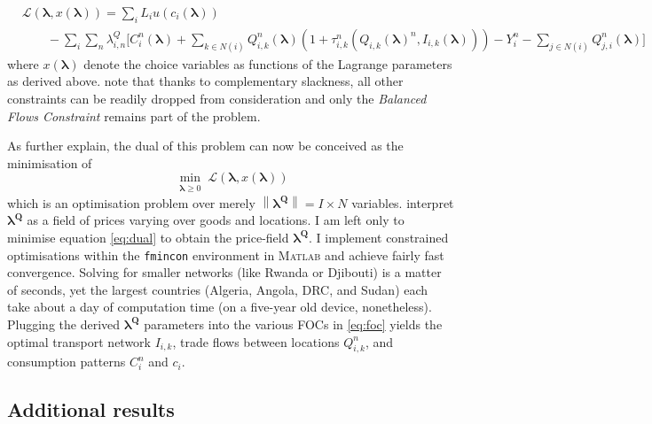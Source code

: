 \documentclass[11pt, oneside]{article}   	%
\begin{document}
\begin{equation}
  \label{eq:dual}
  \begin{aligned}
    & \mathcal{L}(\bm{\lambda}, x(\bm{\lambda})) = \sum_{i}^{} L_{i}u(c_{i}(\bm{\lambda})) \\
  & \qquad - \sum_{i}^{}\sum_{n}^{}\lambda^{Q}_{i,n}\bigg[ C_{i}^{n}(\bm{\lambda}) + \sum_{k\in N(i)}^{}Q_{i,k}^{n}(\bm{\lambda})(1+\tau_{i,k}^{n}(Q_{i,k}(\bm{\lambda})^{n}, I_{i,k}(\bm{\lambda}))) - Y_{i}^{n} - \sum_{j\in N(i)}^{}Q_{j,i}^{n}(\bm{\lambda}) \bigg]
  \end{aligned}
\end{equation}
where $x(\bm{\lambda})$ denote the choice variables as functions of the Lagrange parameters as derived above. \citeauthor{fajgelbaum_optimal_2017} note that thanks to complementary slackness, all other constraints can be readily dropped from consideration and only the \emph{Balanced Flows Constraint} remains part of the problem.

As \citeauthor{fajgelbaum_optimal_2017} further explain, the dual of this problem can now be conceived as the minimisation of
\begin{equation*}
  \!\min_{\substack{\bm{\lambda} \geq 0}}\mathcal{L}(\bm{\lambda}, x(\bm{\lambda}))
\end{equation*}
which is an optimisation problem over merely $\left\lVert\bm{\lambda^{Q}}\right\rVert = I \times N$ variables. \citeauthor{fajgelbaum_optimal_2017} interpret $\bm{\lambda^{Q}}$ as a field of prices varying over goods and locations. I am left only to minimise equation \eqref{eq:dual} to obtain the price-field $\bm{\lambda^{Q}}$. I implement constrained optimisations within the \texttt{fmincon} environment in \textsc{Matlab} and achieve fairly fast convergence. Solving for smaller networks (like Rwanda or Djibouti) is a matter of seconds, yet the largest countries (Algeria, Angola, DRC, and Sudan) each take about a day of computation time (on a five-year old device, nonetheless). Plugging the derived $\bm{\lambda^{Q}}$ parameters into the various FOCs in \eqref{eq:foc} yields the optimal transport network $I_{i,k}$, trade flows between locations $Q_{i,k}^{n}$, and consumption patterns $C_{i}^{n}$ and $c_{i}$.

\vfill
  \subsection{Additional results}
\end{document}
